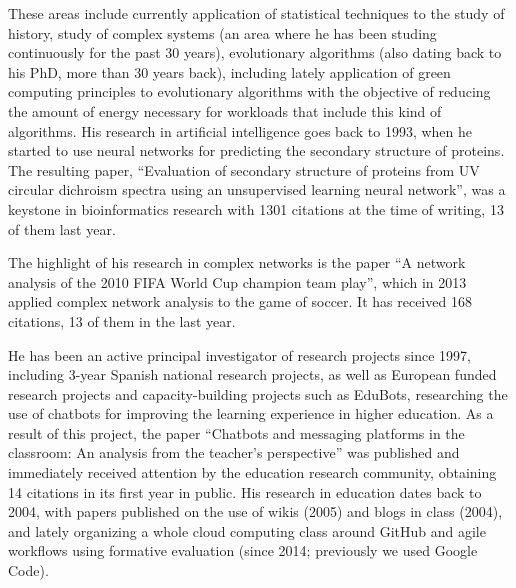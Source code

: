\documentclass[a4paper,12pt]{article}
\begin{document}
These areas include currently application of statistical techniques to the study
of history, study of complex systems (an area where he has been studing
continuously for the past 30 years), evolutionary algorithms (also dating back
to his PhD, more than 30 years back), including lately application of green
computing principles to evolutionary algorithms with the objective of reducing
the amount of energy necessary for workloads that include this kind of
algorithms. His research in artificial intelligence goes back to 1993, when he
started to use neural networks for predicting the secondary structure of
proteins. The resulting paper, ``Evaluation of secondary structure of proteins
from UV circular dichroism spectra using an unsupervised learning neural
network'', was a keystone in bioinformatics research with 1301 citations at the
time of writing, 13 of them last year.

The highlight of his research in complex networks is the paper ``A network analysis of the 2010 FIFA World Cup champion team play'', which in 2013 applied complex network analysis to the game of soccer. It has received 168 citations, 13 of them in the last year.

He has been an active principal investigator of research projects since 1997,
including 3-year Spanish national research projects, as well as European funded
research projects and capacity-building projects such as EduBots, researching
the use of chatbots for improving the learning experience in higher
education. As a result of this project, the paper ``Chatbots and messaging
platforms in the classroom: An analysis from the teacher’s perspective'' was
published and immediately received attention by the education research
community, obtaining 14 citations in its first year in public. His research in
education dates back to 2004, with papers published on the use of wikis (2005) and
blogs in class (2004), and lately organizing a whole cloud computing class around
GitHub and agile workflows using formative evaluation (since 2014; previously we
used Google Code).

\end{document}
